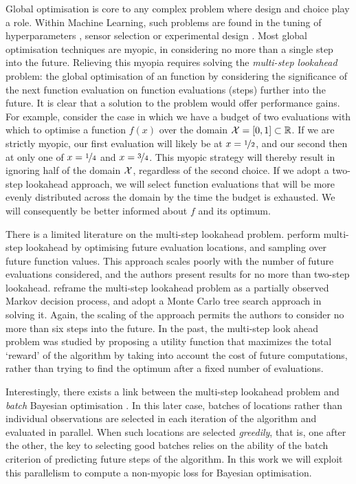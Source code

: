\documentclass[twoside]{article}
\newcommand{\reals}{\mathbb{R}}
\begin{document}
Global optimisation is core to any complex problem where design and choice play a role. 
Within Machine Learning, such problems are found in the tuning of hyperparameters \citep{Snoek*Larochelle*Adams_2012}, sensor selection \citep{Garnett*Osborne*Roberts_2010} or experimental design \citep{gonzalez2014, martinez-cantin_bayesian_2009}. 
Most global optimisation techniques are myopic, in considering no more than a single step into the future. 
Relieving this myopia requires solving the \emph{multi-step lookahead} problem: the global optimisation of an function by considering the significance of the next function evaluation on function evaluations (steps) further into the future. 
It is clear that a solution to the problem would offer performance gains.
For example, consider the case in which we have a budget of two evaluations with which to optimise a function $f(x)$ over the domain $\inputSpace = [0, 1] \subset \reals$. 
If we are strictly myopic, our first evaluation will likely be at 
$x=\nicefrac{1}{2}$, and our second then at only one of $x=\nicefrac{1}{4}$ and $x=\nicefrac{3}{4}$. 
This myopic strategy will thereby result in ignoring half of the domain $\mathcal{X}$, regardless of the second choice. 
If we adopt a two-step lookahead approach, we will select function evaluations that will be more evenly distributed across the domain by the time the budget is exhausted. 
We will consequently be better informed about $f$ and its optimum.

There is a limited literature on the multi-step lookahead problem.
\cite{osborne_gaussian_2009} perform multi-step lookahead by optimising future evaluation locations, and sampling over future function values. 
This approach scales poorly with the number of future evaluations considered, and the authors present results for no more than two-step lookahead.
\citep{Marchant*Ramos*Sanner*2014} reframe the multi-step lookahead problem as a partially observed Markov decision process, and adopt a Monte Carlo tree search approach in solving it. 
Again, the scaling of the approach permits the authors to consider no more than six steps into the future. In the past, the multi-step look ahead problem was studied by \cite{StreltsovVakili1999} proposing a utility function that maximizes the total `reward' of the algorithm by taking into account the cost of future computations, rather than trying to find the optimum after a fixed number of evaluations.

Interestingly, there exists a link between the multi-step lookahead problem and \emph{batch} Bayesian optimisation \citep{Ginsbourger2009,Azimi2011,Azimi2012}. In this later case, batches of locations rather than individual observations are selected in each iteration of the algorithm and evaluated in parallel. When such locations are selected \emph{greedily}, that is, one after the other, the key to selecting good batches relies on the ability of the batch criterion of predicting future steps of the algorithm. In this work we will exploit this parallelism to compute a non-myopic loss for Bayesian optimisation. 
\end{document}
